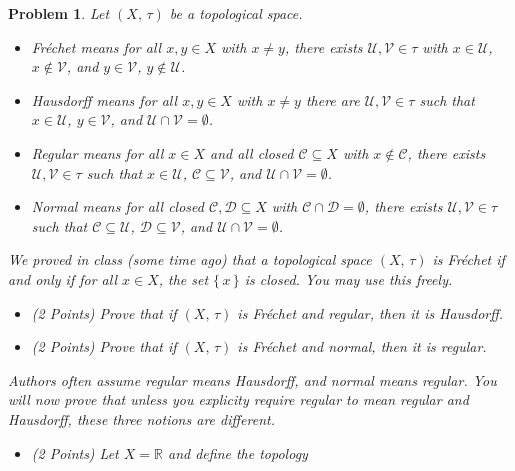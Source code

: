 \documentclass{article}
\theoremstyle{normal}
\newtheorem{problem}{Problem}
\begin{document}
    \begin{problem}
        Let $(X,\,\tau)$ be a topological space.
        \begin{itemize}
            \item Fr\'{e}chet means for all $x,y\in{X}$ with $x\ne{y}$, there
                exists $\mathcal{U},\mathcal{V}\in\tau$ with $x\in\mathcal{U}$,
                $x\notin\mathcal{V}$, and $y\in\mathcal{V}$,
                $y\notin\mathcal{U}$.
            \item Hausdorff means for all $x,y\in{X}$ with $x\ne{y}$ there
                are $\mathcal{U},\mathcal{V}\in\tau$ such that
                $x\in\mathcal{U}$, $y\in\mathcal{V}$, and
                $\mathcal{U}\cap\mathcal{V}=\emptyset$.
            \item Regular means for all $x\in{X}$ and all closed
                $\mathcal{C}\subseteq{X}$ with $x\notin\mathcal{C}$, there
                exists $\mathcal{U},\mathcal{V}\in\tau$ such that
                $x\in\mathcal{U}$, $\mathcal{C}\subseteq\mathcal{V}$, and
                $\mathcal{U}\cap\mathcal{V}=\emptyset$.
            \item Normal means for all closed
                $\mathcal{C},\mathcal{D}\subseteq{X}$ with
                $\mathcal{C}\cap\mathcal{D}=\emptyset$, there exists
                $\mathcal{U},\mathcal{V}\in\tau$ such that
                $\mathcal{C}\subseteq\mathcal{U}$,
                $\mathcal{D}\subseteq\mathcal{V}$, and
                $\mathcal{U}\cap\mathcal{V}=\emptyset$.
        \end{itemize}
        We proved in class (some time ago) that a topological space $(X,\,\tau)$
        is Fr\'{e}chet if and only if for all $x\in{X}$, the set
        $\{\,x\,\}$ is closed. You may use this freely. 
        \begin{itemize}
            \item (2 Points) Prove that if $(X,\,\tau)$ is Fr\'{e}chet and
                regular, then it is Hausdorff.
            \item (2 Points) Prove that if $(X,\,\tau)$ is Fr\'{e}chet and
                normal, then it is regular.
        \end{itemize}
        Authors often assume regular means Hausdorff, and normal means regular.
        You will now prove that unless you explicity require regular to mean
        regular and Hausdorff, these three notions are different.
        \begin{itemize}
            \item (2 Points) Let $X=\mathbb{R}$ and define the topology

\end{itemize}
\end{problem}
\end{document}
